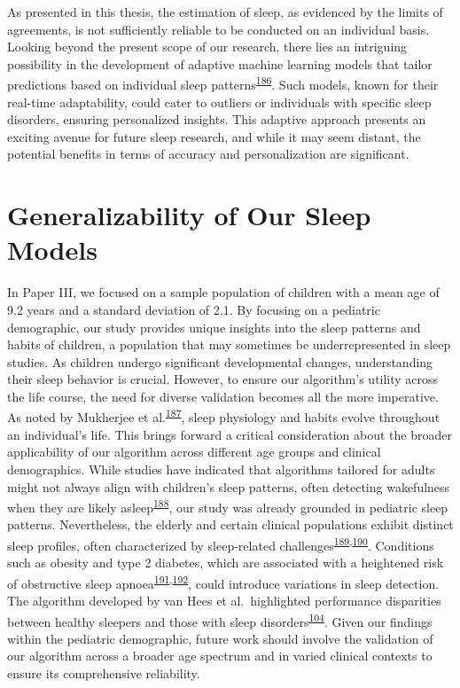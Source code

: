 \documentclass[
  10pt,
]{scrbook}
\begin{document}
As presented in this thesis, the estimation of sleep, as evidenced by
the limits of agreements, is not sufficiently reliable to be conducted
on an individual basis. Looking beyond the present scope of our
research, there lies an intriguing possibility in the development of
adaptive machine learning models that tailor predictions based on
individual sleep
patterns\textsuperscript{\protect\hyperlink{ref-oyebode_2023}{186}}.
Such models, known for their real-time adaptability, could cater to
outliers or individuals with specific sleep disorders, ensuring
personalized insights. This adaptive approach presents an exciting
avenue for future sleep research, and while it may seem distant, the
potential benefits in terms of accuracy and personalization are
significant.

\hypertarget{generalizability-of-our-sleep-models}{%
\section{Generalizability of Our Sleep
Models}\label{generalizability-of-our-sleep-models}}

In Paper III, we focused on a sample population of children with a mean
age of 9.2 years and a standard deviation of 2.1. By focusing on a
pediatric demographic, our study provides unique insights into the sleep
patterns and habits of children, a population that may sometimes be
underrepresented in sleep studies. As children undergo significant
developmental changes, understanding their sleep behavior is crucial.
However, to ensure our algorithm's utility across the life course, the
need for diverse validation becomes all the more imperative. As noted by
Mukherjee et
al.\textsuperscript{\protect\hyperlink{ref-mukherjee_2015}{187}}, sleep
physiology and habits evolve throughout an individual's life. This
brings forward a critical consideration about the broader applicability
of our algorithm across different age groups and clinical demographics.
While studies have indicated that algorithms tailored for adults might
not always align with children's sleep patterns, often detecting
wakefulness when they are likely
asleep\textsuperscript{\protect\hyperlink{ref-quante_2018}{188}}, our
study was already grounded in pediatric sleep patterns. Nevertheless,
the elderly and certain clinical populations exhibit distinct sleep
profiles, often characterized by sleep-related
challenges\textsuperscript{\protect\hyperlink{ref-cassidy_2016}{189},\protect\hyperlink{ref-espiritu_2008}{190}}.
Conditions such as obesity and type 2 diabetes, which are associated
with a heightened risk of obstructive sleep
apnoea\textsuperscript{\protect\hyperlink{ref-altaf_2017}{191},\protect\hyperlink{ref-heinzer_2015}{192}},
could introduce variations in sleep detection. The algorithm developed
by van Hees et al.~highlighted performance disparities between healthy
sleepers and those with sleep
disorders\textsuperscript{\protect\hyperlink{ref-van_hees_estimating_2018}{104}}.
Given our findings within the pediatric demographic, future work should
involve the validation of our algorithm across a broader age spectrum
and in varied clinical contexts to ensure its comprehensive reliability.
\end{document}
